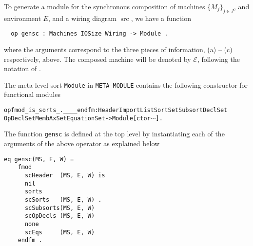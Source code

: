 \documentclass[copyright,creativecommons]{eptcs}
\newcommand{\E}{\mathcal{E}}
\DeclareMathOperator{\src}{src}
\begin{document}
To generate a module for the synchronous composition of machines $\{M_j\}_{j
\in J}$, and environment $E$, and a wiring diagram $\src$, we have a function

\begin{center}
\begin{small}
\begin{boxedminipage}{0.60\textwidth}
\begin{verbatim}
  op gensc : Machines IOSize Wiring -> Module .
\end{verbatim}
\end{boxedminipage}
\end{small}
\end{center}

\noindent 
where the arguments correspond to the three pieces of information, (a) -- (c)
respectively, above. The composed machine will be denoted by $\E$, following
the notation of \cite{meseguer_2010_01,meseguer_2009_01}.

The meta-level sort {\tt Module} in {\tt META-MODULE} contains the following
constructor for functional modules

\begin{center}
\begin{small}
\begin{boxedminipage}{0.90\textwidth}
\begin{alltt}
op fmod_is_sorts_.____endfm : Header ImportList SortSet SubsortDeclSet
  OpDeclSet MembAxSet EquationSet -> Module [ctor \(\dotsb\)].
\end{alltt}
\end{boxedminipage}
\end{small}
\end{center}

\noindent
The function {\tt gensc} is defined at the top level by instantiating each of
the arguments of the above operator as explained below

\begin{center}
\begin{small}
\begin{boxedminipage}{0.40\textwidth}
\begin{verbatim}
eq gensc(MS, E, W) =
    fmod
      scHeader  (MS, E, W) is 
      nil 
      sorts 
      scSorts   (MS, E, W) . 
      scSubsorts(MS, E, W) 
      scOpDecls (MS, E, W) 
      none 
      scEqs     (MS, E, W) 
    endfm .
\end{verbatim}
\end{boxedminipage}
\end{small}
\end{center}
\end{document}
